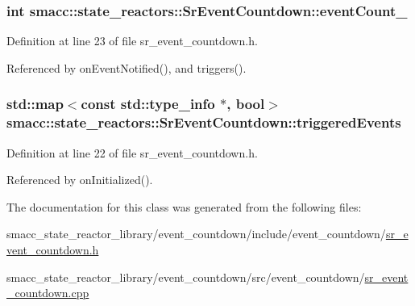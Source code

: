 \subsubsection[{\texorpdfstring{event\+Count\+\_\+}{eventCount_}}]{\setlength{\rightskip}{0pt plus 5cm}int smacc\+::state\+\_\+reactors\+::\+Sr\+Event\+Countdown\+::event\+Count\+\_\+\hspace{0.3cm}{\ttfamily [private]}}\hypertarget{classsmacc_1_1state__reactors_1_1SrEventCountdown_aa3b1de656f3d3cadadc47f00c4e0be86}{}\label{classsmacc_1_1state__reactors_1_1SrEventCountdown_aa3b1de656f3d3cadadc47f00c4e0be86}


Definition at line 23 of file sr\+\_\+event\+\_\+countdown.\+h.



Referenced by on\+Event\+Notified(), and triggers().

\subsubsection[{\texorpdfstring{triggered\+Events}{triggeredEvents}}]{\setlength{\rightskip}{0pt plus 5cm}std\+::map$<$const std\+::type\+\_\+info $\ast$, {\bf bool}$>$ smacc\+::state\+\_\+reactors\+::\+Sr\+Event\+Countdown\+::triggered\+Events\hspace{0.3cm}{\ttfamily [private]}}\hypertarget{classsmacc_1_1state__reactors_1_1SrEventCountdown_a6f9b3a51e8e8becbf76f99a5d0bcb8c5}{}\label{classsmacc_1_1state__reactors_1_1SrEventCountdown_a6f9b3a51e8e8becbf76f99a5d0bcb8c5}


Definition at line 22 of file sr\+\_\+event\+\_\+countdown.\+h.



Referenced by on\+Initialized().



The documentation for this class was generated from the following files\+:\begin{DoxyCompactItemize}
\item 
smacc\+\_\+state\+\_\+reactor\+\_\+library/event\+\_\+countdown/include/event\+\_\+countdown/\hyperlink{sr__event__countdown_8h}{sr\+\_\+event\+\_\+countdown.\+h}\item 
smacc\+\_\+state\+\_\+reactor\+\_\+library/event\+\_\+countdown/src/event\+\_\+countdown/\hyperlink{sr__event__countdown_8cpp}{sr\+\_\+event\+\_\+countdown.\+cpp}\end{DoxyCompactItemize}
